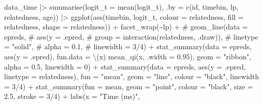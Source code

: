 \documentclass[
  letterpaper,
  DIV=11,
  numbers=noendperiod]{scrartcl}
\newenvironment{Shaded}{\begin{snugshade}}{\end{snugshade}}
\newcommand{\AttributeTok}[1]{\textcolor[rgb]{0.40,0.45,0.13}{#1}}
\newcommand{\CommentTok}[1]{\textcolor[rgb]{0.37,0.37,0.37}{#1}}
\newcommand{\DecValTok}[1]{\textcolor[rgb]{0.68,0.00,0.00}{#1}}
\newcommand{\FloatTok}[1]{\textcolor[rgb]{0.68,0.00,0.00}{#1}}
\newcommand{\FunctionTok}[1]{\textcolor[rgb]{0.28,0.35,0.67}{#1}}
\newcommand{\NormalTok}[1]{\textcolor[rgb]{0.00,0.23,0.31}{#1}}
\newcommand{\SpecialCharTok}[1]{\textcolor[rgb]{0.37,0.37,0.37}{#1}}
\newcommand{\StringTok}[1]{\textcolor[rgb]{0.13,0.47,0.30}{#1}}
\begin{document}
\begin{Shaded}
\begin{Highlighting}[]
\NormalTok{data\_time }\SpecialCharTok{|\textgreater{}} 
    \FunctionTok{summarise}\NormalTok{(}\AttributeTok{logit\_t =} \FunctionTok{mean}\NormalTok{(logit\_t),}
              \AttributeTok{.by =} \FunctionTok{c}\NormalTok{(id, timebin, lp, relatedness, age)) }\SpecialCharTok{|\textgreater{}} 
    \FunctionTok{ggplot}\NormalTok{(}\FunctionTok{aes}\NormalTok{(timebin, logit\_t, }
               \AttributeTok{colour =}\NormalTok{ relatedness,}
               \AttributeTok{fill =}\NormalTok{ relatedness,}
               \AttributeTok{shape =}\NormalTok{ relatedness)) }\SpecialCharTok{+}
    \FunctionTok{facet\_wrap}\NormalTok{(}\SpecialCharTok{\textasciitilde{}}\NormalTok{lp) }\SpecialCharTok{+}
    \CommentTok{\# geom\_line(data = epreds,}
    \CommentTok{\#         aes(y = .epred,}
    \CommentTok{\#           group = interaction(relatedness, .draw)),}
    \CommentTok{\#         linetype = "solid",}
    \CommentTok{\#         alpha = 0.1,}
    \CommentTok{\#         linewidth = 3/4) +}
    \FunctionTok{stat\_summary}\NormalTok{(}\AttributeTok{data =}\NormalTok{ epreds,}
                 \FunctionTok{aes}\NormalTok{(}\AttributeTok{y =}\NormalTok{ .epred),}
                 \AttributeTok{fun.data =}\NormalTok{ \textbackslash{}(x) }\FunctionTok{mean\_qi}\NormalTok{(x, }\AttributeTok{.width =} \FloatTok{0.95}\NormalTok{),}
                 \AttributeTok{geom =} \StringTok{"ribbon"}\NormalTok{,}
                 \AttributeTok{alpha =} \FloatTok{0.5}\NormalTok{,}
                 \AttributeTok{linewidth =} \DecValTok{0}\NormalTok{) }\SpecialCharTok{+}
    \FunctionTok{stat\_summary}\NormalTok{(}\AttributeTok{data =}\NormalTok{ epreds,}
                 \FunctionTok{aes}\NormalTok{(}\AttributeTok{y =}\NormalTok{ .epred,}
                    \AttributeTok{linetype =}\NormalTok{ relatedness),}
                 \AttributeTok{fun =} \StringTok{"mean"}\NormalTok{,}
                 \AttributeTok{geom =} \StringTok{"line"}\NormalTok{,}
                 \AttributeTok{colour =} \StringTok{"black"}\NormalTok{,}
                 \AttributeTok{linewidth =} \DecValTok{3}\SpecialCharTok{/}\DecValTok{4}\NormalTok{) }\SpecialCharTok{+}
    \FunctionTok{stat\_summary}\NormalTok{(}\AttributeTok{fun =}\NormalTok{ mean,}
                 \AttributeTok{geom =} \StringTok{"point"}\NormalTok{,}
                 \AttributeTok{colour =} \StringTok{"black"}\NormalTok{,}
                 \AttributeTok{size =} \FloatTok{2.5}\NormalTok{,}
                 \AttributeTok{stroke =} \DecValTok{3}\SpecialCharTok{/}\DecValTok{4}\NormalTok{) }\SpecialCharTok{+}
    \FunctionTok{labs}\NormalTok{(}\AttributeTok{x =} \StringTok{"Time (ms)"}\NormalTok{,}

\end{Highlighting}
\end{Shaded}
\end{document}
